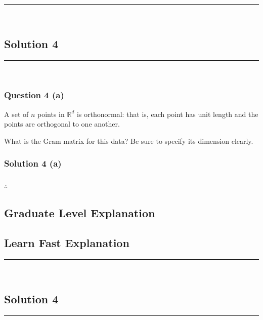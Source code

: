 \documentclass{article}
\begin{document}
\noindent\rule{\textwidth}{0.4pt}\\

\newpage

\subsection*{Solution 4}
\noindent\rule{\textwidth}{0.4pt}\\
\subsubsection*{Question 4 (a)}
\begin{flushleft}
    A set of $n$ points in $\mathbb{R}^d$ is orthonormal: that is, each point has unit length and the points are orthogonal to one another.

\end{flushleft}
\begin{flushleft}
    What is the Gram matrix for this data? Be sure to specify its dimension clearly.
    
\end{flushleft}

\subsubsection*{Solution 4 (a)}


\subsubsection*{\normalfont}{$\therefore$ }

\subsection*{Graduate Level Explanation}

\subsection*{Learn Fast Explanation}

\noindent\rule{\textwidth}{0.4pt}\\

\newpage


\subsection*{Solution 4}
\noindent\rule{\textwidth}{0.4pt}\\
\end{document}
